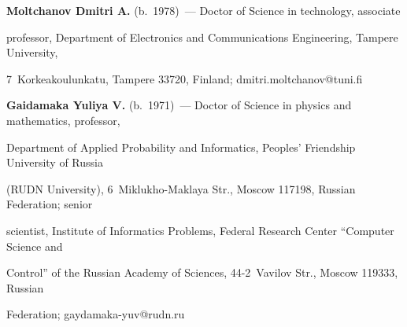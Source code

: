   \noindent


  \textbf{Moltchanov Dmitri A.} (b.\ 1978)~--- Doctor of Science in technology, associate 


professor, Department of Electronics and Communications Engineering, Tampere University, 


7~Korkeakoulunkatu, Tampere 33720, Finland; \mbox{dmitri.moltchanov@tuni.fi}


  


  \vspace*{3pt}


  


  \noindent


\textbf{Gaidamaka Yuliya V.} (b.\ 1971)~--- Doctor of Science in physics and mathematics, professor, 


Department of Applied Probability and Informatics, Peoples' Friendship University of Russia 


(RUDN University), 6~Miklukho-Maklaya Str., Moscow 117198, Russian Federation; senior 


scientist, Institute of Informatics Problems, Federal Research Center ``Computer Science and 


Control'' of the Russian Academy of Sciences, 44-2~Vavilov Str., Moscow 119333, Russian 


Federation; \mbox{gaydamaka-yuv@rudn.ru}





\label{end\stat}





\renewcommand{\bibname}{\protect\rm Литература} 


  


